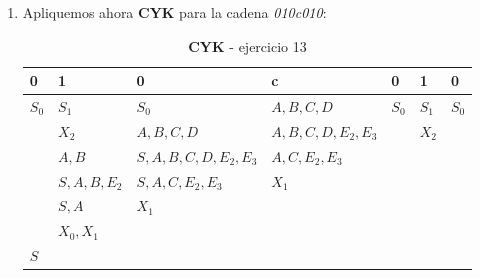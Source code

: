 \documentclass[11pt,a4paper]{article}
\begin{document}
\begin {enumerate}
\item Apliquemos ahora \textbf{CYK} para la cadena \emph{010c010}:

\begin{table}[h]
	\centering
	\caption{\textbf{CYK} - ejercicio 13}
	\label{my-label}
	\begin{tabular}{lllllll}
		0                           & 1                                & 0                                        & c                                      & 0                          & 1                          & 0                          \\ \hline
		\multicolumn{1}{|l|}{$S_0$} & \multicolumn{1}{l|}{$S_1$}       & \multicolumn{1}{l|}{$S_0$}               & \multicolumn{1}{l|}{$A,B,C,D$}         & \multicolumn{1}{l|}{$S_0$} & \multicolumn{1}{l|}{$S_1$} & \multicolumn{1}{l|}{$S_0$} \\ \hline
		\multicolumn{1}{|l|}{}      & \multicolumn{1}{l|}{$X_2$}       & \multicolumn{1}{l|}{$A,B,C,D$}           & \multicolumn{1}{l|}{$A,B,C,D,E_2,E_3$} & \multicolumn{1}{l|}{}      & \multicolumn{1}{l|}{$X_2$} &                            \\ \cline{1-6}
		\multicolumn{1}{|l|}{}      & \multicolumn{1}{l|}{$A,B$}       & \multicolumn{1}{l|}{$S,A,B,C,D,E_2,E_3$} & \multicolumn{1}{l|}{$A,C,E_2,E_3$}     & \multicolumn{1}{l|}{}      &                            &                            \\ \cline{1-5}
		\multicolumn{1}{|l|}{}      & \multicolumn{1}{l|}{$S,A,B,E_2$} & \multicolumn{1}{l|}{$S,A,C,E_2,E_3$}     & \multicolumn{1}{l|}{$X_1$}             &                            &                            &                            \\ \cline{1-4}
		\multicolumn{1}{|l|}{}      & \multicolumn{1}{l|}{$S,A$}       & \multicolumn{1}{l|}{$X_1$}               &                                        &                            &                            &                            \\ \cline{1-3}
		\multicolumn{1}{|l|}{}      & \multicolumn{1}{l|}{$X_0,X_1$}   &                                          &                                        &                            &                            &                            \\ \cline{1-2}
		\multicolumn{1}{|l|}{$S$}   &                                  &                                          &                                        &                            &                            &                            \\ \cline{1-1}
	\end{tabular}
\end{table}

\end{enumerate}
\end{document}

